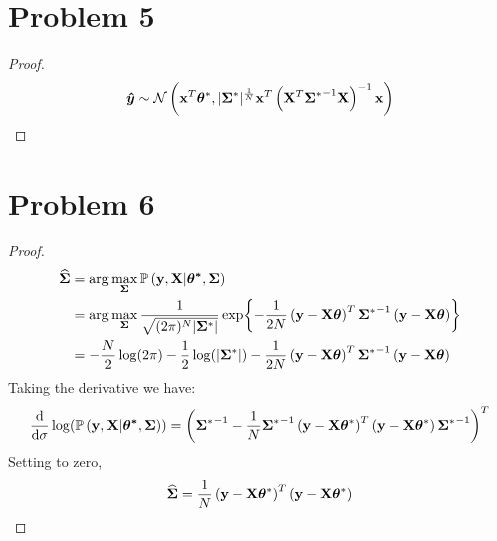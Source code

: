 \documentclass{article}
\begin{document}
\section*{Problem 5}
    \begin{proof}
        $$\vb*{\hat{y}} \sim \mathcal{N}\left(\vb{x}^T \bm{\theta}^*,|\bm{\Sigma}^*|^{\frac{1}{N}}\vb{x}^T\left(\vb{X}^T{\bm{\Sigma}^*}^{-1}\vb{X}\right)^{-1}\vb{x}\right)$$
    \end{proof}

\section*{Problem 6}
    \begin{proof}
    \begin{align*}
        \bm{\widehat{\Sigma}}
        &=\arg{\max_{\bm{\Sigma}} \mathbb{P}\left(\vb{y},\vb{X}|\bm{\theta^*}, \bm{\Sigma}\right) }\\
        &=\arg{\max_{\bm{\Sigma}} \frac{1}{\sqrt{(2\pi)^N |\bm{\Sigma}^*|}}\exp{-\frac{1}{2N}\left(\vb{y}-\vb{X}\bm{\theta}\right)^T{\bm{\Sigma}^*}^{-1}\left(\vb{y}-\vb{X}\bm{\theta}\right)} }\\
        &=-\frac{N}{2}\log(2\pi)-\frac{1}{2}\log(|\bm{\Sigma}^*|)-\frac{1}{2N}\left(\vb{y}-\vb{X}\bm{\theta}\right)^T{\bm{\Sigma}^*}^{-1}\left(\vb{y}-\vb{X}\bm{\theta}\right)
    \end{align*}
    Taking the derivative we have:
    $$\frac{\text{d}}{\text{d}\sigma}\log(\mathbb{P}\left(\vb{y},\vb{X}|\bm{\theta^*}, \bm{\Sigma}\right))
    =\left({\bm{\Sigma}^*}^{-1}-\frac{1}{N}{\bm{\Sigma}^*}^{-1}\left(\vb{y}-\vb{X}\bm{\theta}^*\right)^T\left(\vb{y}-\vb{X}\bm{\theta}^*\right){\bm{\Sigma}^*}^{-1}\right)^T$$
    Setting to zero,
    $$\bm{\widehat{\Sigma}}=\frac{1}{N}\left(\vb{y}-\vb{X}\bm{\theta}^*\right)^T\left(\vb{y}-\vb{X}\bm{\theta}^*\right)$$
    \end{proof}

\end{document}
